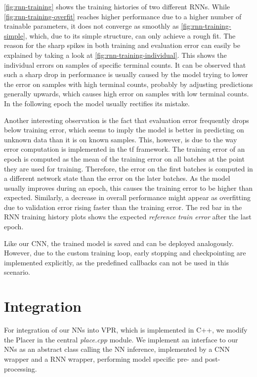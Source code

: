 \ref{fig:rnn-training} shows the training histories of two different \glspl{RNN}. While \ref{fig:rnn-training-overfit} reaches higher performance due to a higher number of trainable parameters, it does not converge as smoothly as \ref{fig:rnn-training-simple}, which, due to its simple structure, can only achieve a rough fit. The reason for the sharp spikes in both training and evaluation error can easily be explained by taking a look at \ref{fig:rnn-training-individual}. This shows the individual errors on samples of specific terminal counts. It can be observed that such a sharp drop in performance is usually caused by the model trying to lower the error on samples with high terminal counts, probably by adjusting predictions generally upwards, which causes high error on samples with low terminal counts. In the following epoch the model usually rectifies its mistake.

Another interesting observation is the fact that evaluation error frequently drops below training error, which seems to imply the model is better in predicting on unknown data than it is on known samples. This, however, is due to the way error computation is implemented in the \gls{tf} framework\cite{keras-faq-web}. The training error of an epoch is computed as the mean of the training error on all batches at the point they are used for training. Therefore, the error on the first batches is computed in a different network state than the error on the later batches. As the model usually improves during an epoch, this causes the training error to be higher than expected. Similarly, a decrease in overall performance might appear as overfitting due to validation error rising faster than the training error. The red bar in the \gls{RNN} training history plots shows the expected \textit{reference train error} after the last epoch.

Like our \gls{CNN}, the trained model is saved and can be deployed analogously. However, due to the custom training loop, early stopping and checkpointing are implemented explicitly, as the predefined callbacks can not be used in this scenario.

\section{Integration}

For integration of our \glspl{NN} into \gls{VPR}, which is implemented in C++, we modify the Placer in the central \textit{place.cpp} module. We implement an interface to our \glspl{NN} as an abstract class calling the \gls{NN} inference, implemented by a \gls{CNN} wrapper and a \gls{RNN} wrapper, performing model specific pre- and post-processing.


